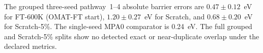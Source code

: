 The grouped three-seed pathway~1--4 absolute barrier errors are $0.47\pm0.12$~eV for FT-600K (OMAT-FT start), $1.20\pm0.27$~eV for Scratch, and $0.68\pm0.20$~eV for Scratch-5\%. The single-seed MPA0 comparator is 0.24~eV. The full grouped and Scratch-5\% splits show no detected exact or near-duplicate overlap under the declared metrics.
